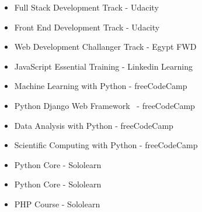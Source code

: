 \documentclass[10pt,a4paper,ragged2e,withhyper]{altacv}
\begin{document}
\begin{paracol}{2}
\begin{itemize}
\item Full Stack Development Track - Udacity
\item Front End Development Track - Udacity
\item Web Development Challanger Track - Egypt FWD
\item JavaScript Essential Training - Linkedin Learning
\item Machine Learning with Python - freeCodeCamp
\item Python Django Web Framework \ - freeCodeCamp
\item Data Analysis with Python - freeCodeCamp
\item Scientific Computing with Python - freeCodeCamp
\item Python Core - Sololearn
\item Python Core - Sololearn
\item PHP Course - Sololearn






\end{itemize}







\end{paracol}
\end{document}
